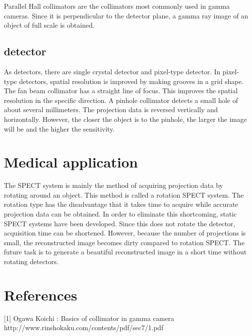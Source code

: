 \documentclass[dvipdfmx,autodetect-engine]{jsarticle}%
\begin{document}
Parallel Hall collimators are the collimators most commonly used in gamma cameras. Since it is perpendicular to the detector plane, a gamma ray image of an object of full scale is obtained.
\subsection{detector}
As detectors, there are single crystal detector and pixel-type detector. In pixel-type detectors, spatial resolution is improved by making grooves in a grid shape. The fan beam collimator has a straight line of focus. This improves the spatial resolution in the specific direction. A pinhole collimator detects a small hole of about several millimeters. The projection data is reversed vertically and horizontally. However, the closer the object is to the pinhole, the larger the image will be and the higher the sensitivity.


\section{Medical application}
The SPECT system is mainly the method of acquiring projection data by rotating around an object. This method is called a rotation SPECT system. The rotation type has the disadvantage that it takes time to acquire while accurate projection data can be obtained. In order to eliminate this shortcoming, static SPECT systems have been developed. Since this does not rotate the detector, acquisition time can be shortened. However, because the number of projections is small, the reconstructed image becomes dirty compared to rotation SPECT. The future task is to generate a beautiful reconstructed image in a short time without rotating detectors.

\section{References}
[1] Ogawa Koichi : Basics of collimator in gamma camera\\
http://www.rinshokaku.com/contents/pdf/sec7/1.pdf
\end{document}
